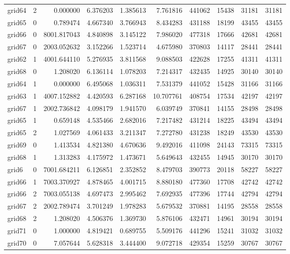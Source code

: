 \begin{longtable}{|l|r|r|r|r|r|r|r|r|r|}
grid64 & 2 & 0.000000 & 6.376203 & 1.385613 & 7.761816 & 441062 & 15438 & 31181 & 31181 \\
grid65 & 0 & 0.789474 & 4.667340 & 3.766943 & 8.434283 & 431188 & 18199 & 43455 & 43455 \\
grid66 & 0 & 8001.817043 & 4.840898 & 3.145122 & 7.986020 & 477318 & 17666 & 42681 & 42681 \\
grid67 & 0 & 2003.052632 & 3.152266 & 1.523714 & 4.675980 & 370803 & 14117 & 28441 & 28441 \\
grid62 & 1 & 4001.644110 & 5.276935 & 3.811568 & 9.088503 & 422628 & 17255 & 41311 & 41311 \\
grid68 & 0 & 1.208020 & 6.136114 & 1.078203 & 7.214317 & 432435 & 14925 & 30140 & 30140 \\
grid64 & 1 & 0.000000 & 6.495068 & 1.036311 & 7.531379 & 441052 & 15428 & 31166 & 31166 \\
grid63 & 1 & 4007.152882 & 4.420593 & 6.287168 & 10.707761 & 408754 & 17534 & 42197 & 42197 \\
grid67 & 1 & 2002.736842 & 4.098179 & 1.941570 & 6.039749 & 370841 & 14155 & 28498 & 28498 \\
grid65 & 1 & 0.659148 & 4.535466 & 2.682016 & 7.217482 & 431214 & 18225 & 43494 & 43494 \\
grid65 & 2 & 1.027569 & 4.061433 & 3.211347 & 7.272780 & 431238 & 18249 & 43530 & 43530 \\
grid69 & 0 & 1.413534 & 4.821380 & 4.670636 & 9.492016 & 411098 & 24143 & 73315 & 73315 \\
grid68 & 1 & 1.313283 & 4.175972 & 1.473671 & 5.649643 & 432455 & 14945 & 30170 & 30170 \\
grid6 & 0 & 7001.684211 & 6.126851 & 2.352852 & 8.479703 & 390773 & 20118 & 58227 & 58227 \\
grid66 & 1 & 7003.370927 & 4.878465 & 4.001715 & 8.880180 & 477360 & 17708 & 42742 & 42742 \\
grid66 & 2 & 7003.055138 & 4.697473 & 2.995462 & 7.692935 & 477396 & 17744 & 42794 & 42794 \\
grid67 & 2 & 2002.789474 & 3.701249 & 1.978283 & 5.679532 & 370881 & 14195 & 28558 & 28558 \\
grid68 & 2 & 1.208020 & 4.506376 & 1.369730 & 5.876106 & 432471 & 14961 & 30194 & 30194 \\
grid71 & 0 & 1.000000 & 4.819421 & 0.689755 & 5.509176 & 441296 & 15241 & 31032 & 31032 \\
grid70 & 0 & 7.057644 & 5.628318 & 3.444400 & 9.072718 & 429354 & 15259 & 30767 & 30767 \\

\end{longtable}
